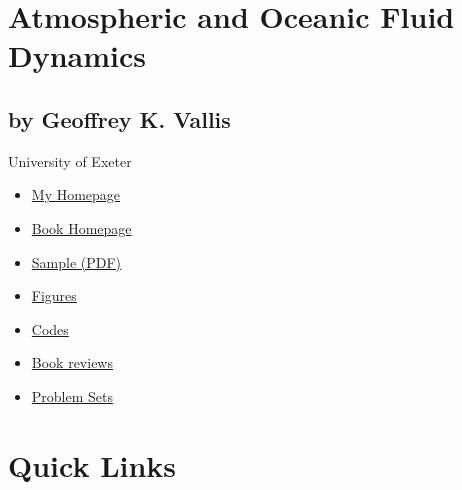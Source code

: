 \hypertarget{wrapper}{}
\hypertarget{header}{}
\section{Atmospheric and Oceanic Fluid
Dynamics}\label{atmospheric-and-oceanic-fluid-dynamics}

\subsection{by Geoffrey K. Vallis}\label{by-geoffrey-k.-vallis}

University of Exeter

\hypertarget{page_content}{}
\begin{itemize}
\tightlist
\item
  \href{http://empslocal.ex.ac.uk/people/staff/gv219/}{My Homepage}
\item
  \href{http://empslocal.ex.ac.uk/people/staff/gv219/aofd}{Book
  Homepage}
\item
  \href{aofd-sample.pdf}{Sample (PDF)}
\item
  \href{http://empslocal.ex.ac.uk/people/staff/gv219/aofdfigures}{Figures}
\item
  \href{http://empslocal.ex.ac.uk/people/staff/gv219/codes/index.html}{Codes}
\item
  \href{http://empslocal.ex.ac.uk/people/staff/gv219/aofdreviews/}{Book
  reviews}
\item
  \href{http://empslocal.ex.ac.uk/people/staff/gv219/Problems/}{Problem
  Sets}
\end{itemize}

\section{Quick Links}\label{quick-links}


